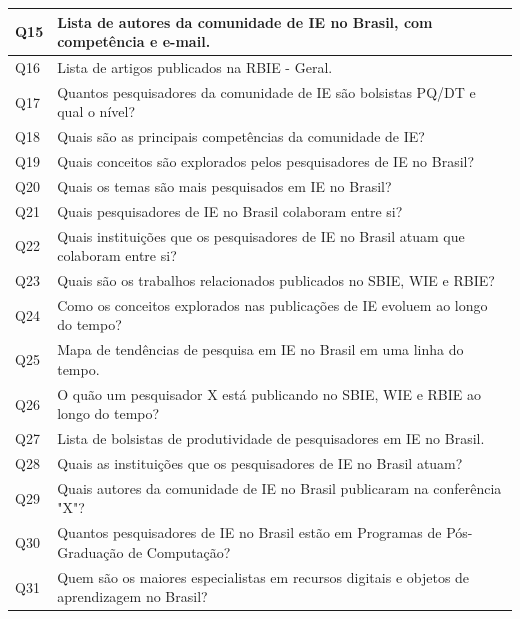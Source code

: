 \begin{table}[!ht]
\begin{tabular}{|l|l|}
		Q15 & Lista de autores da comunidade de IE no Brasil, com competência e e-mail.                                            \\ \hline
		Q16 & Lista de artigos publicados na RBIE - Geral.                                       \\ \hline
		Q17 & Quantos pesquisadores da comunidade de IE são bolsistas PQ/DT e qual o nível?                           \\ \hline
		Q18 & Quais são as principais competências da comunidade de IE?                         \\ \hline
		Q19 & Quais conceitos são explorados pelos pesquisadores de IE no Brasil?                                                   \\ \hline
		Q20 & Quais os temas são mais pesquisados em IE no Brasil?                                        \\ \hline
		Q21 & Quais pesquisadores de IE no Brasil colaboram entre si?                                           \\ \hline
		Q22 & Quais instituições que os pesquisadores de IE no Brasil atuam que colaboram entre si?                                            \\ \hline
		Q23 & Quais são os trabalhos relacionados publicados no SBIE, WIE e RBIE?                                              \\ \hline
		Q24 & Como os conceitos explorados nas publicações de IE evoluem ao longo do tempo?                   \\ \hline
		Q25 & Mapa de tendências de pesquisa em IE no Brasil em uma linha do tempo.                             \\ \hline
		Q26 & O quão um pesquisador X está publicando no SBIE, WIE e RBIE ao longo do tempo?    \\ \hline
		Q27 & Lista de bolsistas de produtividade de pesquisadores em IE no Brasil.                                               \\ \hline
		Q28 & Quais as instituições que os pesquisadores de IE no Brasil atuam?                                                            \\ \hline
% 
% 
%
%
		Q29 & Quais autores da comunidade de IE no Brasil publicaram na conferência "X"?                                      \\ \hline
		Q30 & Quantos pesquisadores de IE no Brasil estão em Programas de Pós-Graduação de Computação?      \\ \hline
		Q31 & Quem são os maiores especialistas em recursos digitais e objetos de aprendizagem no Brasil? \\ \hline
	\end{tabular}
\end{table}

